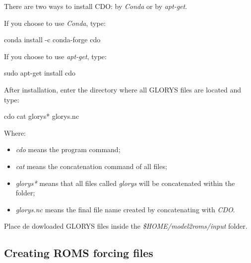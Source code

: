 There are two ways to install CDO: by \textit{Conda} or by \textit{apt-get}.
\bigskip

If you choose to use \textit{Conda}, type:
\bigskip

\begin{bashcode}
conda install -c conda-forge cdo
\end{bashcode}
\bigskip

If you choose to use \textit{apt-get}, type:
\bigskip

\begin{bashcode}
sudo apt-get install cdo
\end{bashcode}
\bigskip

After installation, enter the directory where all GLORYS files are located and type:
\bigskip

\begin{bashcode}
cdo cat glorys* glorys.nc
\end{bashcode}
\bigskip

Where: 
\bigskip

\begin{itemize}
    \item  \textit{cdo} means the program command;
    \item \textit{cat} means the concatenation command of all files;
    \item \textit{glorys*} means that all files called \textit{glorys} will be concatenated within the folder;
    \item \textit{glorys.nc} means the final file name created by concatenating with \textit{CDO}.
\end{itemize}
\bigskip

\begin{tcolorbox}[enhanced,
    grow to left by   = 0cm,
    grow to right by  = 0cm,
    enlarge top by    = 0cm,
    enlarge bottom by = 0cm,
    tcbox raise base,
    boxrule           = 1.0pt,
    left              = 18mm,
    colframe          = red!50!black,coltext=red!25!black,colback=red!10!white,
    overlay           = {\begin{tcbclipinterior}\fill[red!75!blue!50!white] (frame.south west)
      rectangle node[text=white,font=\sffamily\bfseries\footnotesize,rotate=0] {WARNING} ([xshift=18mm]frame.north west);\end{tcbclipinterior}}]
Place de dowloaded GLORYS files inside the \textit{\$HOME/model2roms/input} folder.
\end{tcolorbox}

\subsection{Creating ROMS forcing files}
\bigskip

